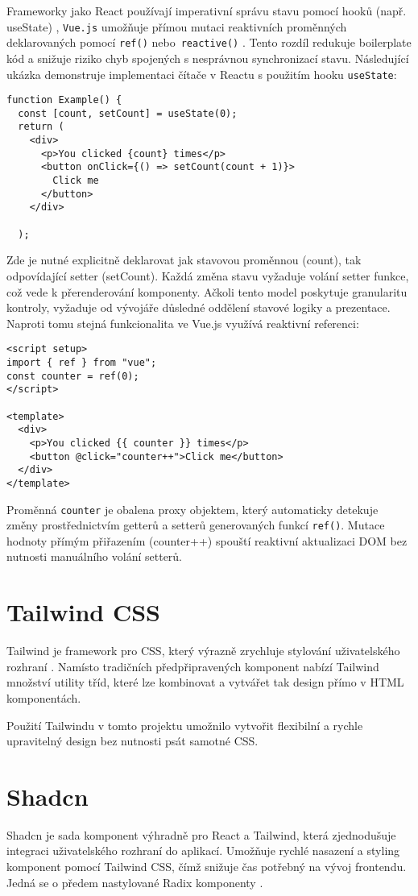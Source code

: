 Frameworky jako React používají imperativní správu stavu pomocí hooků (např. useState) \cite{bugl2019learn}, \texttt{Vue.js} umožňuje přímou mutaci reaktivních proměnných deklarovaných pomocí \texttt{ref()} nebo~\texttt{reactive()} \cite{vuejsVuejsDocs}. Tento rozdíl redukuje boilerplate kód a snižuje riziko chyb spojených s nesprávnou synchronizací stavu. Následující ukázka demonstruje implementaci čítače v Reactu s použitím hooku \texttt{useState}:
\begin{lstlisting}
function Example() {
  const [count, setCount] = useState(0);
  return (
    <div>
      <p>You clicked {count} times</p>
      <button onClick={() => setCount(count + 1)}>
        Click me
      </button>
    </div>

  );
\end{lstlisting}
Zde je nutné explicitně deklarovat jak stavovou proměnnou (count), tak odpovídající setter (setCount). Každá změna stavu vyžaduje volání setter funkce, což vede k přerenderování komponenty. Ačkoli tento model poskytuje granularitu kontroly, vyžaduje od vývojáře důsledné oddělení stavové logiky a prezentace. Naproti tomu stejná funkcionalita ve Vue.js využívá reaktivní referenci:
\begin{lstlisting}
<script setup>
import { ref } from "vue";
const counter = ref(0);
</script>

<template>
  <div>
    <p>You clicked {{ counter }} times</p>
    <button @click="counter++">Click me</button>
  </div>
</template>
\end{lstlisting}
Proměnná \texttt{counter} je obalena proxy objektem, který automaticky detekuje změny prostřednictvím getterů a setterů generovaných funkcí \texttt{ref()}. Mutace hodnoty přímým přiřazením (counter++) spouští reaktivní aktualizaci DOM bez nutnosti manuálního volání setterů.

\section{Tailwind CSS}
Tailwind je framework pro CSS, který výrazně zrychluje stylování uživatelského rozhraní \cite{tailwindcssTailwindRapidly}. Namísto tradičních předpřipravených komponent nabízí Tailwind množství utility tříd, které lze kombinovat a vytvářet tak design přímo v HTML komponentách.

Použití Tailwindu v tomto projektu umožnilo vytvořit flexibilní a rychle upravitelný design bez nutnosti psát samotné CSS.

\section{Shadcn}
Shadcn je sada komponent výhradně pro React a Tailwind, která zjednodušuje integraci uživatelského rozhraní do aplikací. Umožňuje rychlé nasazení a styling komponent pomocí Tailwind CSS, čímž snižuje čas potřebný na vývoj frontendu. Jedná se o předem nastylované Radix komponenty \cite{shadcnIntroduction}.

